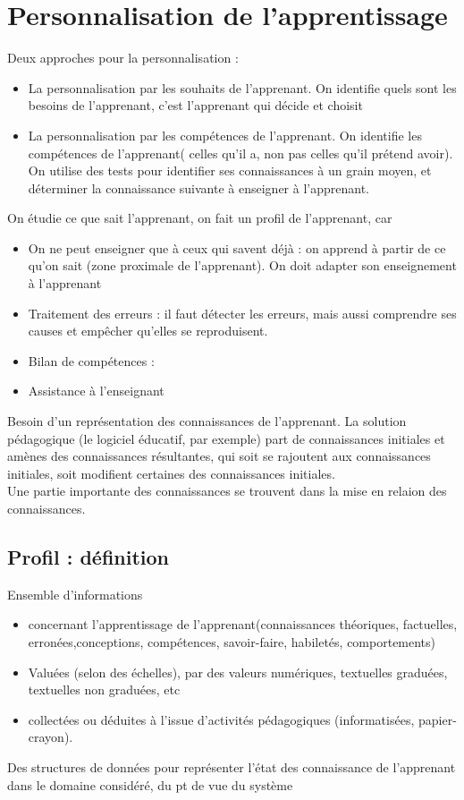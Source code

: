 \documentclass[11pt]{article}
\begin{document}
\begin{itemize}
\end{itemize}

\vskip 4cm

\section{Personnalisation de l'apprentissage}

Deux approches pour la personnalisation :
\begin{itemize}
	\item La personnalisation par les souhaits de l'apprenant. On identifie quels sont les besoins de l'apprenant, c'est l'apprenant qui décide et choisit
	\item La personnalisation par les compétences de l'apprenant. On identifie les compétences de l'apprenant( celles qu'il a, non pas celles qu'il prétend avoir). On utilise des tests pour identifier ses connaissances à un grain moyen, et déterminer la connaissance suivante à enseigner à l'apprenant.
\end{itemize}


\vskip 1cm
On étudie ce que sait l'apprenant, on fait un profil de l'apprenant, car
\begin{itemize}
	\item On ne peut enseigner que à ceux qui savent déjà : on apprend à partir de ce qu'on sait (zone proximale de l'apprenant). On doit adapter son enseignement à l'apprenant
	\item Traitement des erreurs : il faut détecter les erreurs, mais aussi comprendre ses causes et empêcher qu'elles se reproduisent.
	\item Bilan de compétences :
	\item Assistance à l'enseignant
\end{itemize}

Besoin d'un représentation des connaissances de l'apprenant.
La solution pédagogique (le logiciel éducatif, par exemple) part de connaissances initiales et amènes des connaissances résultantes, qui soit se rajoutent aux connaissances initiales, soit modifient certaines des connaissances initiales.\\
Une partie importante des connaissances se trouvent dans la mise en relaion des connaissances.


\subsection{Profil : définition}
Ensemble d'informations
\begin{itemize}
	\item concernant l'apprentissage de l'apprenant(connaissances théoriques, factuelles, erronées,conceptions,  compétences, savoir-faire, habiletés, comportements)
	\item Valuées (selon des échelles), par des valeurs numériques, textuelles graduées, textuelles non graduées, etc
	\item collectées ou déduites à l'issue d'activités pédagogiques (informatisées, papier-crayon). 
\end{itemize}
Des structures de données pour représenter l'état des connaissance de l'apprenant dans le domaine considéré, du pt de vue du système
\end{document}

